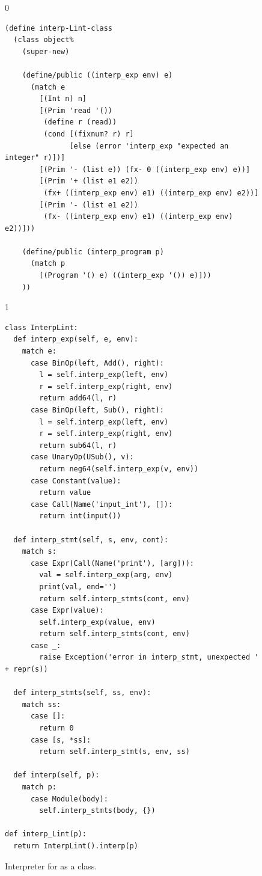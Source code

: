 \documentclass[7x10]{TimesAPriori_MIT}%
\def\racketEd{0}
\def\pythonEd{1}
\providecommand{\BookEdition}{1}
\let\edition\BookEdition
\newcommand{\pythonColor}[0]{}
\numberwithin{theorem}{chapter}
\numberwithin{definition}{chapter}
\numberwithin{equation}{chapter}
\begin{document}
\begin{figure}[tp]
\begin{tcolorbox}[colback=white]
{\if\edition\racketEd
\begin{lstlisting}
(define interp-Lint-class
  (class object%
    (super-new)
    
    (define/public ((interp_exp env) e)
      (match e
        [(Int n) n]
        [(Prim 'read '())
         (define r (read))
         (cond [(fixnum? r) r]
               [else (error 'interp_exp "expected an integer" r)])]
        [(Prim '- (list e)) (fx- 0 ((interp_exp env) e))]
        [(Prim '+ (list e1 e2))
         (fx+ ((interp_exp env) e1) ((interp_exp env) e2))]
        [(Prim '- (list e1 e2))
         (fx- ((interp_exp env) e1) ((interp_exp env) e2))]))

    (define/public (interp_program p)
      (match p
        [(Program '() e) ((interp_exp '()) e)]))
    ))
\end{lstlisting}
\fi}
{\if\edition\pythonEd\pythonColor
\begin{lstlisting}
class InterpLint:
  def interp_exp(self, e, env):
    match e:
      case BinOp(left, Add(), right):
        l = self.interp_exp(left, env)
        r = self.interp_exp(right, env)
        return add64(l, r)
      case BinOp(left, Sub(), right):
        l = self.interp_exp(left, env)
        r = self.interp_exp(right, env)
        return sub64(l, r)
      case UnaryOp(USub(), v):
        return neg64(self.interp_exp(v, env))
      case Constant(value):
        return value
      case Call(Name('input_int'), []):
        return int(input())            

  def interp_stmt(self, s, env, cont):
    match s:
      case Expr(Call(Name('print'), [arg])):
        val = self.interp_exp(arg, env)
        print(val, end='')
        return self.interp_stmts(cont, env)
      case Expr(value):
        self.interp_exp(value, env)
        return self.interp_stmts(cont, env)
      case _:
        raise Exception('error in interp_stmt, unexpected ' + repr(s))
    
  def interp_stmts(self, ss, env):
    match ss:
      case []:
        return 0
      case [s, *ss]:
        return self.interp_stmt(s, env, ss)

  def interp(self, p):
    match p:
      case Module(body):
        self.interp_stmts(body, {})

def interp_Lint(p):
  return InterpLint().interp(p)
\end{lstlisting}
\fi}
\end{tcolorbox}
\caption{Interpreter for \LangInt{} as a class.}
\label{fig:interp-Lint-class}
\end{figure}
\end{document}
